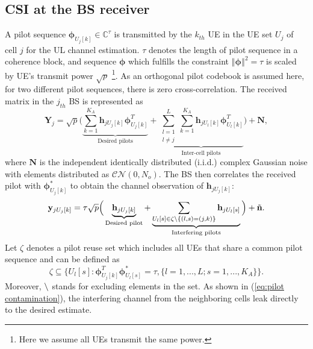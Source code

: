 \subsection{CSI at the BS receiver}
A pilot sequence $\mathbf{\phi}_{U_j[k]}\in \mathbb{C}^{\tau} $ is transmitted by the $k_{th}$ UE in the UE set $U_j$ of cell $j$ for the UL channel estimation. $\tau$ denotes the length of pilot sequence in a coherence block, and sequence $\mathbf{{\phi}}$ which fulfills the constraint $\left\Vert\mathbf{\phi}\right\Vert^2=\tau$ is scaled by UE's transmit power $\sqrt{p}$ \footnote{Here we assume all UEs transmit the same power. }. As an orthogonal pilot codebook is assumed here, for two different pilot sequences, there is zero cross-correlation.  The received matrix in the $j_{th}$ BS is represented as 
\begin{equation} \label{eq:Yj}
\mathbf{Y}_j = \sqrt{p}\Big(\underbrace{\sum_{k = 1}^{K_A} \mathbf{h}_{jU_j[k]} \mathbf{\phi}_{U_j[k]}^T}_\text{Desired pilots} +\underbrace{\sum_{\substack{l=1 \\ l\neq j}}^{L}\sum_{k = 1}^{K_A} \mathbf{h}_{jU_l[k]} \mathbf{\phi}_{U_l[k]}^T}_\text{Inter-cell pilots}\Big) + \mathbf{N},   
\end{equation}
where $\mathbf{N}$ is the independent identically distributed
(i.i.d.) complex Gaussian noise with elements distributed as $\mathcal{CN\left(\mathit{0,N_o}\right)}$.
The BS then correlates the received pilot with $\mathbf{\phi}_{U_j[k]}^*$ to obtain the channel observation of $\mathbf{h}_{jU_j[k]}$:%
\begin{equation} 
\mathbf{y}_{jU_j[k]} = \tau\sqrt{p}\Big(\underbrace{\mathbf{h}_{jU_j[k]}}_\text{Desired pilot} +\underbrace{\sum_{U_l[s]\in \\ \zeta\char`\\\{(l,s) = (j,k)\}}\mathbf{h}_{jU_l[s]}}_\text{Interfering pilots}\Big) + \tilde{\mathbf{n}}.   \label{eq:pilot contamination}
\end{equation}
Let $\zeta$ denotes a pilot reuse set which includes all UEs that share a common pilot sequence and can be defined as
\begin{equation}
\zeta \subseteq \{U_l[s]:\mathbf{\phi}_{U_j[k]}^T \mathbf{\phi}_{U_l[s]}^*=\tau, \{l=1,...,L;s=1,...,K_A\}\}.
\end{equation}
Moreover, $\char`\\$ stands for excluding elements in the set. As shown in (\ref{eq:pilot contamination}), the interfering channel from the neighboring cells leak directly to the desired estimate.

